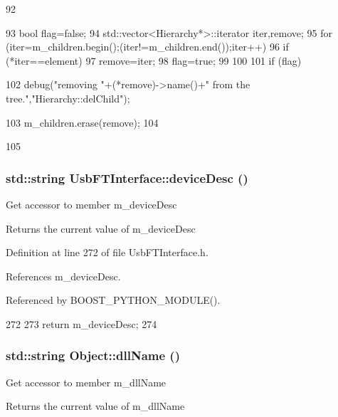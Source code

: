 \begin{DoxyCode}
92                                           {
93   bool flag=false;
94   std::vector<Hierarchy*>::iterator iter,remove;
95   for (iter=m_children.begin();(iter!=m_children.end());iter++){
96     if (*iter==element){
97       remove=iter;
98       flag=true;
99     }
100   }
101   if (flag){
102     debug("removing "+(*remove)->name()+" from the tree.","Hierarchy::delChild");
      
103     m_children.erase(remove);
104   }
105 }
\end{DoxyCode}
\hypertarget{classUsbFTInterface_af353796fd68a869ea5c8e753aa65dc2c}{
\subsubsection[{deviceDesc}]{\setlength{\rightskip}{0pt plus 5cm}std::string UsbFTInterface::deviceDesc ()}}
\label{classUsbFTInterface_af353796fd68a869ea5c8e753aa65dc2c}
Get accessor to member m\_\-deviceDesc \begin{DoxyReturn}{Returns}
the current value of m\_\-deviceDesc 
\end{DoxyReturn}


Definition at line 272 of file UsbFTInterface.h.

References m\_\-deviceDesc.

Referenced by BOOST\_\-PYTHON\_\-MODULE().


\begin{DoxyCode}
272                           {
273     return m_deviceDesc;
274   }
\end{DoxyCode}
\hypertarget{classObject_a2e3947f2870094c332d7454117f3ec63}{
\subsubsection[{dllName}]{\setlength{\rightskip}{0pt plus 5cm}std::string Object::dllName ()}}
\label{classObject_a2e3947f2870094c332d7454117f3ec63}
Get accessor to member m\_\-dllName \begin{DoxyReturn}{Returns}
the current value of m\_\-dllName 
\end{DoxyReturn}



